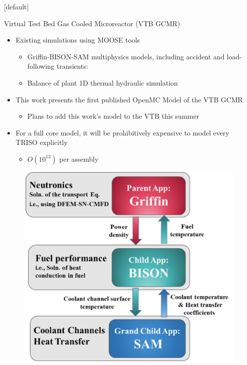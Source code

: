 \documentclass[9pt,t,aspectratio=169]{beamer}
\makeatletter
\newenvironment{withoutheadline}{
       \setbeamertemplate{headline}[default]
       \def\beamer@entrycode{\vspace*{-\headheight}}
    }{}
\makeatother
\begin{document}
\begin{withoutheadline}
\begin{frame}{Virtual Test Bed Gas Cooled Microreactor (VTB GCMR)}
    \pause
    \LARGE
    \begin{minipage}[t]{0.55\linewidth}
        \begin{itemize}
            \item<2-> Existing simulations using MOOSE tools
            \begin{itemize}
                \Large
                \item<2-> Griffin-BISON-SAM multiphysics models, including accident and load-following transients:  \cite{Stauff-applications-2022,Abdelhameed-ANS-2022, HF_MRs_ANL}
                \item<2-> Balance of plant 1D thermal hydraulic simulation \cite{Duchnowski_plant_balance_2022}
            \end{itemize}
            \item<3-> This work presents the first published OpenMC Model of the VTB GCMR
            \begin{itemize}
                \Large
                \item<3->Plans to add this work's model to the VTB this summer
            \end{itemize}
            \item<4-> For a full core model, it will be prohibitively expensive to model every TRISO explicitly
            \begin{itemize}
                \Large
                \item<4-> $O(10^{13})$ per assembly
            \end{itemize}
        \end{itemize}
    \end{minipage}
    \hfill%
    \begin{minipage}[t]{0.4\linewidth}
        \begin{figure}
            \centering
            \includegraphics[width=\linewidth]{figures/gcmr_preliminary_mutliapps.png}

\end{figure}
\end{minipage}
\end{frame}
\end{withoutheadline}
\end{document}
